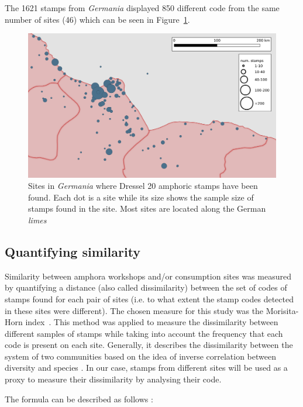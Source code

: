 The 1621 stamps from \textit{Germania} displayed 850 different code from the same number of sites (46) which can be seen in Figure~\ref{germania}.

\begin{figure}[htp]
	\centering
\includegraphics[width=\linewidth]{germania}
\caption{Sites in \textit{Germania} where Dressel 20 amphoric stamps have been found. Each dot is a site while its size shows the sample size of stamps found in the site. Most sites are located along the German \textit{limes}}
\label{germania}
\end{figure}

\subsection{Quantifying similarity}
\label{sec:5}

Similarity between amphora workshops and/or consumption sites was measured by quantifying a distance (also called dissimilarity) between the set of codes of stamps found for each pair of sites (i.e. to what extent the stamp codes detected in these sites were different). The chosen measure for this study was the Morisita-Horn index~\citep{morisita_measuring_1959, horn_measurement_1966}. This method was applied to measure the dissimilarity between different samples of stamps while taking into account the frequency that each code is present on each site. Generally, it describes the dissimilarity between the system of two communities based on the idea of inverse correlation between diversity and species \citep{magurran_why_1988}. In our case, stamps from different sites will be used as a proxy to measure their dissimilarity by analysing their code. 

The formula can be described as follows \citep{magurran_measuring_2013}:

